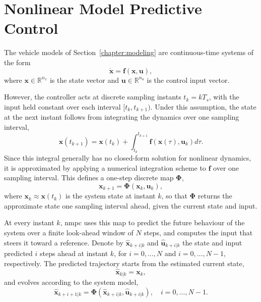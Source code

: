 \section{Nonlinear Model Predictive Control}
\label{sec:ctrl_nmpc_principles}

The vehicle models of Section~\ref{chapter:modeling} are continuous-time systems of the form
\begin{equation}
    \dot{\mathbf{x}} = \mathbf{f}\left( \mathbf{x}, \mathbf{u} \right),
    \label{eq:nmpc_dynamics_continuous}
\end{equation}
where $\mathbf{x} \in \mathbb{R}^{n_x}$ is the state vector and $\mathbf{u} \in \mathbb{R}^{n_u}$ is the control input vector.

However, the controller acts at discrete sampling instants $t_k = k T_s$, with the input held constant over each interval $[t_k, t_{k+1})$. Under this assumption, the state at the next instant follows from integrating the dynamics over one sampling interval,
\begin{equation}
    \mathbf{x}(t_{k+1}) = \mathbf{x}(t_k) + \int_{t_k}^{t_{k+1}} \mathbf{f}\left( \mathbf{x}(\tau), \mathbf{u}_k \right) d\tau.
    \label{eq:nmpc_dynamics_integral}
\end{equation}
Since this integral generally has no closed-form solution for nonlinear dynamics, it is approximated by applying a numerical integration scheme to $\mathbf{f}$ over one sampling interval. This defines a one-step discrete map $\boldsymbol\Phi$,
\begin{equation}
    \mathbf{x}_{k+1} = \boldsymbol\Phi\left( \mathbf{x}_k, \mathbf{u}_k \right),
    \label{eq:nmpc_dynamics_general}
\end{equation}
where $\mathbf{x}_k \approx \mathbf{x}(t_k)$ is the system state at instant $k$, so that $\boldsymbol\Phi$ returns the approximate state one sampling interval ahead, given the current state and input.

At every instant $k$, \gls{nmpc} uses this map to predict the future behaviour of the system over a finite look-ahead window of $N$ steps, and computes the input that steers it toward a reference. Denote by $\hat{\mathbf{x}}_{k+i|k}$ and $\hat{\mathbf{u}}_{k+i|k}$ the state and input predicted $i$ steps ahead at instant $k$, for $i = 0, \dots, N$ and $i = 0, \dots, N-1$, respectively. The predicted trajectory starts from the estimated current state,
\begin{equation}
    \hat{\mathbf{x}}_{k|k} = \mathbf{x}_k,
    \label{eq:nmpc_x0}
\end{equation}
and evolves according to the system model,
\begin{equation}
    \hat{\mathbf{x}}_{k+i+1|k} = \boldsymbol\Phi\left( \hat{\mathbf{x}}_{k+i|k}, \hat{\mathbf{u}}_{k+i|k} \right), \quad i = 0, \dots, N-1.
    \label{eq:nmpc_prediction}
\end{equation}

